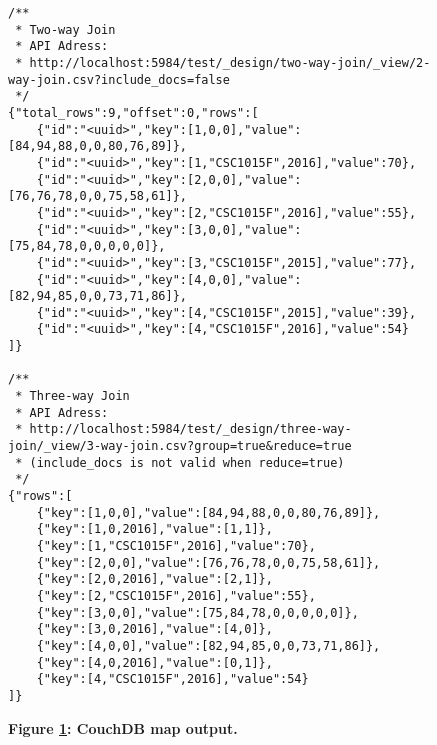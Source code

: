 \begin{figure}[H]
    \centering
    \begin{mdframed}[rightline=false,leftline=false]
        \begin{verbatim}
/**
 * Two-way Join
 * API Adress:
 * http://localhost:5984/test/_design/two-way-join/_view/2-way-join.csv?include_docs=false
 */
{"total_rows":9,"offset":0,"rows":[
    {"id":"<uuid>","key":[1,0,0],"value":[84,94,88,0,0,80,76,89]},
    {"id":"<uuid>","key":[1,"CSC1015F",2016],"value":70},
    {"id":"<uuid>","key":[2,0,0],"value":[76,76,78,0,0,75,58,61]},
    {"id":"<uuid>","key":[2,"CSC1015F",2016],"value":55},
    {"id":"<uuid>","key":[3,0,0],"value":[75,84,78,0,0,0,0,0]},
    {"id":"<uuid>","key":[3,"CSC1015F",2015],"value":77},
    {"id":"<uuid>","key":[4,0,0],"value":[82,94,85,0,0,73,71,86]},
    {"id":"<uuid>","key":[4,"CSC1015F",2015],"value":39},
    {"id":"<uuid>","key":[4,"CSC1015F",2016],"value":54}
]}

/**
 * Three-way Join
 * API Adress:
 * http://localhost:5984/test/_design/three-way-join/_view/3-way-join.csv?group=true&reduce=true
 * (include_docs is not valid when reduce=true)
 */
{"rows":[
    {"key":[1,0,0],"value":[84,94,88,0,0,80,76,89]},
    {"key":[1,0,2016],"value":[1,1]},
    {"key":[1,"CSC1015F",2016],"value":70},
    {"key":[2,0,0],"value":[76,76,78,0,0,75,58,61]},
    {"key":[2,0,2016],"value":[2,1]},
    {"key":[2,"CSC1015F",2016],"value":55},
    {"key":[3,0,0],"value":[75,84,78,0,0,0,0,0]},
    {"key":[3,0,2016],"value":[4,0]},
    {"key":[4,0,0],"value":[82,94,85,0,0,73,71,86]},
    {"key":[4,0,2016],"value":[0,1]},
    {"key":[4,"CSC1015F",2016],"value":54}
]}
        \end{verbatim}
    \end{mdframed}
    \caption[CouchDB map output]{\textbf{Figure \ref{fig-test-map-output}: CouchDB map output.}}
    \label{fig-test-map-output}
\end{figure}
